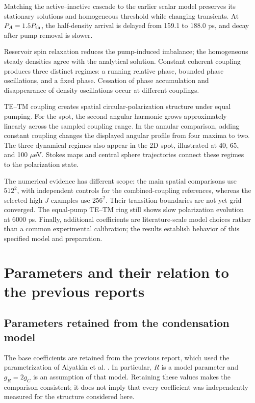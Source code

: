 \documentclass[12pt,a4paper]{article}
\begin{document}
Matching the active--inactive cascade to the earlier scalar model preserves its stationary solutions and homogeneous threshold while changing transients. At \(P_A=1.5P_{\rm th}\), the half-density arrival is delayed from 159.1 to 188.0 ps, and decay after pump removal is slower.

Reservoir spin relaxation reduces the pump-induced imbalance; the homogeneous steady densities agree with the analytical solution. Constant coherent coupling produces three distinct regimes: a running relative phase, bounded phase oscillations, and a fixed phase. Cessation of phase accumulation and disappearance of density oscillations occur at different couplings.

TE--TM coupling creates spatial circular-polarization structure under equal pumping. For the spot, the second angular harmonic grows approximately linearly across the sampled coupling range. In the annular comparison, adding constant coupling changes the displayed angular profile from four maxima to two. The three dynamical regimes also appear in the 2D spot, illustrated at 40, 65, and 100 \ensuremath{\mu}eV. Stokes maps and central sphere trajectories connect these regimes to the polarization state.

The numerical evidence has different scope: the main spatial comparisons use \(512^2\), with independent controls for the combined-coupling references, whereas the selected high-\(J\) examples use \(256^2\). Their transition boundaries are not yet grid-converged. The equal-pump TE--TM ring still shows slow polarization evolution at 6000 ps. Finally, additional coefficients are literature-scale model choices rather than a common experimental calibration; the results establish behavior of this specified model and preparation.

\clearpage
\appendix
\section{Parameters and their relation to the previous reports}

\subsection{Parameters retained from the condensation model}

The base coefficients are retained from the previous report, which used the parametrization of Alyatkin et al. \cite{ref1}. In particular, \(R\) is a model parameter and \(g_R=2g_C\) is an assumption of that model. Retaining these values makes the comparison consistent; it does not imply that every coefficient was independently measured for the structure considered here.
\end{document}
